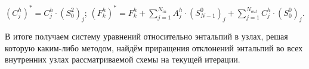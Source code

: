 \noindent $(C_j^h)^{*} = C_j^h \cdot (S_0^2)_j$; $(F_k^h)^{*} = F_k^h+\sum_{j=1}^{N_{in}} A_j^h \cdot (S_{N-1}^0)_j + \sum_{j=1}^{N_{out}} C_j^h \cdot (S_0^0)_j$.

\vspace{12pt}
В итоге получаем систему уравнений относительно энтальпий в узлах, решая которую каким-либо методом, найдём приращения отклонений энтальпий во всех внутренних узлах рассматриваемой схемы на текущей итерации.  







